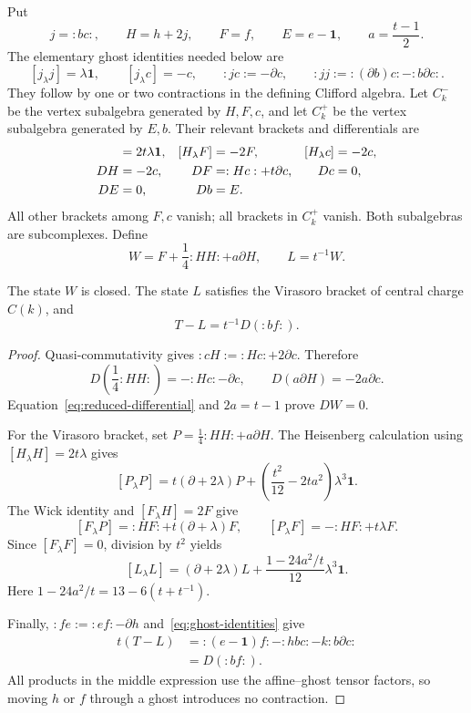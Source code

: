 Put
\[
 j=:bc:,\qquad H=h+2j,\qquad F=f,\qquad E=e-\mathbf1,
 \qquad a=\frac{t-1}{2}.
\]
The elementary ghost identities needed below are
\begin{equation}\label{eq:ghost-identities}
 [j_\lambda j]=\lambda\mathbf1,
 \qquad [j_\lambda c]=-c,
 \qquad :jc:=-\partial c,
 \qquad :jj:=:(\partial b)c:-:b\partial c:.
\end{equation}
They follow by one or two contractions in the defining Clifford algebra.
Let $C_k^-$ be the vertex subalgebra generated by $H,F,c$, and let $C_k^+$ be the vertex subalgebra generated by $E,b$.
Their relevant brackets and differentials are
\begin{align}
 [H_\lambda H]&=2t\lambda\mathbf1,&
 [H_\lambda F]&=-2F,&
 [H_\lambda c]&=-2c,\label{eq:reduced-brackets}\\
 DH&=-2c,&
 DF&=:Hc:+t\partial c,&
 Dc&=0,\label{eq:reduced-differential}\\
 DE&=0,&Db&=E.\notag
\end{align}
All other brackets among $F,c$ vanish; all brackets in $C_k^+$ vanish.
Both subalgebras are subcomplexes.
Define
\begin{equation}\label{eq:W-and-L}
 W=F+\frac14:HH:+a\partial H,
 \qquad L=t^{-1}W.
\end{equation}

\begin{lemma}\label{lem:reduced-virasoro}
The state $W$ is closed.
The state $L$ satisfies the Virasoro bracket of central charge $C(k)$, and
\begin{equation}\label{eq:stress-homology}
 T-L=t^{-1}D(:bf:).
\end{equation}
\end{lemma}

\begin{proof}
Quasi-commutativity gives $:cH:=:Hc:+2\partial c$.
Therefore
\[
 D\left(\frac14:HH:\right)=-:Hc:-\partial c,
 \qquad D(a\partial H)=-2a\partial c.
\]
Equation~\eqref{eq:reduced-differential} and $2a=t-1$ prove $DW=0$.

For the Virasoro bracket, set $P=\frac14:HH:+a\partial H$.
The Heisenberg calculation using $[H_\lambda H]=2t\lambda$ gives
\[
 [P_\lambda P]=t(\partial+2\lambda)P
 +\left(\frac{t^2}{12}-2ta^2\right)\lambda^3\mathbf1.
\]
The Wick identity and $[F_\lambda H]=2F$ give
\[
 [F_\lambda P]=:HF:+t(\partial+\lambda)F,
 \qquad [P_\lambda F]= -:HF:+t\lambda F.
\]
Since $[F_\lambda F]=0$, division by $t^2$ yields
\[
 [L_\lambda L]=(\partial+2\lambda)L
 +\frac{1-24a^2/t}{12}\lambda^3\mathbf1.
\]
Here $1-24a^2/t=13-6(t+t^{-1})$.

Finally, $:fe:=:ef:-\partial h$ and~\eqref{eq:ghost-identities} give
\begin{align*}
 t(T-L)
 &=:(e-\mathbf1)f:-:hbc:-k:b\partial c:\\
 &=D(:bf:).
\end{align*}
All products in the middle expression use the affine--ghost tensor factors, so moving $h$ or $f$ through a ghost introduces no contraction.
\end{proof}

